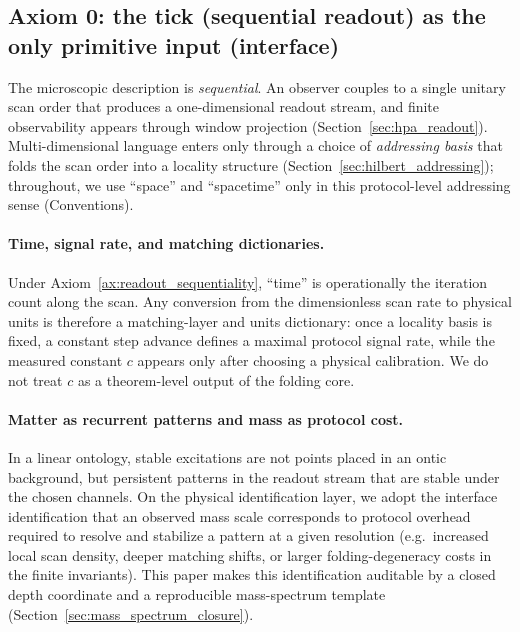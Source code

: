 \subsection{Axiom 0: the tick (sequential readout) as the only primitive input (interface)}
\label{subsec:axiom0_linearity}
\begin{axiom}\label{ax:readout_sequentiality}
The microscopic description is \emph{sequential}.
An observer couples to a single unitary scan order that produces a one-dimensional readout stream, and finite observability appears through window projection (Section~\ref{sec:hpa_readout}).
Multi-dimensional language enters only through a choice of \emph{addressing basis} that folds the scan order into a locality structure (Section~\ref{sec:hilbert_addressing}); throughout, we use ``space'' and ``spacetime'' only in this protocol-level addressing sense (Conventions).
\end{axiom}

\paragraph{Time, signal rate, and matching dictionaries.}
Under Axiom~\ref{ax:readout_sequentiality}, ``time'' is operationally the iteration count along the scan.
Any conversion from the dimensionless scan rate to physical units is therefore a matching-layer and units dictionary: once a locality basis is fixed, a constant step advance defines a maximal protocol signal rate, while the measured constant $c$ appears only after choosing a physical calibration.
We do not treat $c$ as a theorem-level output of the folding core.

\paragraph{Matter as recurrent patterns and mass as protocol cost.}
In a linear ontology, stable excitations are not points placed in an ontic background, but persistent patterns in the readout stream that are stable under the chosen channels.
On the physical identification layer, we adopt the interface identification that an observed mass scale corresponds to protocol overhead required to resolve and stabilize a pattern at a given resolution (e.g.\ increased local scan density, deeper matching shifts, or larger folding-degeneracy costs in the finite invariants).
This paper makes this identification auditable by a closed depth coordinate and a reproducible mass-spectrum template (Section~\ref{sec:mass_spectrum_closure}).

